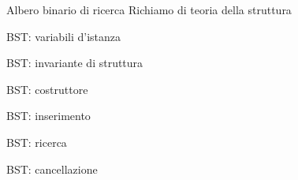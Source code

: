 \documentclass{beamer}
\begin{document}
\begin{frame}{Albero binario di ricerca}
    Richiamo di teoria della struttura
\end{frame}

\begin{frame}{BST: variabili d'istanza}
    
\end{frame}

\begin{frame}{BST: invariante di struttura}
    
\end{frame}

\begin{frame}{BST: costruttore}
    
\end{frame}

\begin{frame}{BST: inserimento}
    
\end{frame}

\begin{frame}{BST: ricerca}
    
\end{frame}

\begin{frame}{BST: cancellazione}
    \only<1>{
        
    }
\end{frame}
\end{document}
